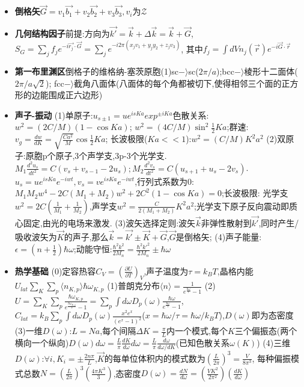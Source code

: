 \documentclass[UTF8,a4paper,3pt,twocolumn]{ctexart}
\begin{document}
\begin{itemize}
  \item \textbf{倒格矢}$\vec{G}=v_1\vec{b_1}+v_2\vec{b_2}+v_3\vec{b_3},v_{i}为\mathcal{Z}$
  \item \textbf{几何结构因子}前提:方向为$\vec{k'}=\vec{k}+\Delta\vec{k}=\vec{k}+\vec{G}$,
  $S_{G}=\sum_{j} f_{j}e^{-i\vec{r_{j}}\cdot\vec{G}}=\sum_{j}e^{-i2\pi(x_j v_1+y_j y_2+z_j v_3)}$,
  其中$f_{j}=\int dVn_{j}(\vec{r})e^{-i\vec{G}\cdot\vec{r}}$
  \item \textbf{第一布里渊区}倒格子的维格纳-塞茨原胞(1)sc$-\rangle$sc($2\pi/a$);bcc$-\rangle$棱形十二面体($2\pi/a\sqrt{2}$);
  fcc$-\rangle$截角八面体(八面体的每个角都被切下,使得相邻三个面的正方形的边能围成正六边形)

  \item \textbf{声子-振动}
  (1)单原子:$u_{s\pm 1}=ue^{isKa}exp^{\pm iKa}$色散关系:$w^2=(2C/M)(1-\cos{Ka})$;
  $w^2=(4C/M)\sin^2{\frac{1}{2}Ka}$;群速:$v_{g}=\frac{dw}{dK}=\sqrt{\frac{Ca^2}{M}}\cos{\frac{1}{2}Ka}$;
  长波极限($Ka<<1$):$w^2=(C/M)K^{2}a^{2}$
  (2)双原子:原胞p个原子,3个声学支,3p-3个光学支.$M_1\frac{d^2 u_s}{dt^2}=C(v_s+v_{s-1}-2u_s);M_2\frac{d^2 v_s}{dt^2}=C(u_{s+1}+u_{s}-2v_s)$.
  $u_s=ue^{isKa}e^{-iwt},v_s=ve^{isKa}e^{-iwt}$,行列式系数为0:$M_1 M_2 w^4-2C(M_1+M_2)w^2+2C^2(1-\cos{Ka})=0$;长波极限:
  光学支$w^2=2C(\frac{1}{M_1}+\frac{1}{M_2})$,声学支$w^2=\frac{C}{2(M_1+M_2)}K^2 a^2$;光学支下原子反向震动即质心固定,由光的电场来激发.
  (3)波矢选择定则:波矢$\vec{k}$非弹性散射到$\vec{k'}$,同时产生/吸收波矢为$\vec{K}$的声子,那么$\vec{k}=\vec{k'}\pm\vec{K}+\vec{G}$,$\vec{G}$是倒格矢;
  (4)声子能量:$\epsilon=(n+\frac{1}{2})\hbar\omega$;动能守恒:$\frac{\hbar^2 k^2}{2M_n}=\frac{\hbar^2 k'^2}{2M_n}\pm\hbar\omega$

  \item \textbf{热学基础}
  (0)定容热容$C_V=(\frac{\partial U}{\partial T})_V$,声子温度为$\tau=k_{B}T$,晶格内能$U_{lat}\sum_{K}\sum_{p}\langle n_{K,p}\rangle\hbar\omega_{K,p}$
  (1)普朗克分布$\langle n\rangle=\frac{1}{e^{\frac{\hbar\omega}{\tau}}-1}$
  (2)$U=\sum_{K}\sum_{p}\frac{\hbar\omega_{K,p}}{e^{\frac{\hbar\omega_{K,p}}{\tau}}-1}=\sum_{p}\int d\omega D_{p}(\omega)\frac{\hbar\omega}{e^{\frac{\hbar\omega}{\tau}}-1}$,
  $C_{lat}=k_{B}\sum_{p}\int d\omega D_{p}(\omega)\frac{x^2 e^x}{(e^x -1)^2}$($x=\hbar\omega/\tau=\hbar\omega/k_{B}T$),$D(\omega)$即为态密度
  (3)一维$D(\omega)$:$L=Na$,每个间隔$\Delta K=\frac{\pi}{L}$内一个模式,每个$K$三个偏振态(两个横向一个纵向)$D(\omega)d\omega=\frac{L}{\pi}\frac{dK}{d\omega}d\omega
  =\frac{L}{\pi}\frac{d\omega}{d\omega/dK}$(已知色散关系$\omega(K)$)
  (4)三维$D(\omega)$:$\forall i, K_{i}=\pm\frac{2n\pi}{L}$,$\vec{K}$的每单位体积内的模式数为$(\frac{L}{2\pi})^3=\frac{V}{8\pi^3}$,
  每种偏振模式总数$N=(\frac{L}{2\pi})^3(\frac{4\pi K^3}{3})$,态密度$D(\omega)=\frac{dN}{d\omega}=(\frac{VK^2}{2\pi^2})(\frac{dK}{d\omega})$
  

\end{itemize}
\end{document}
